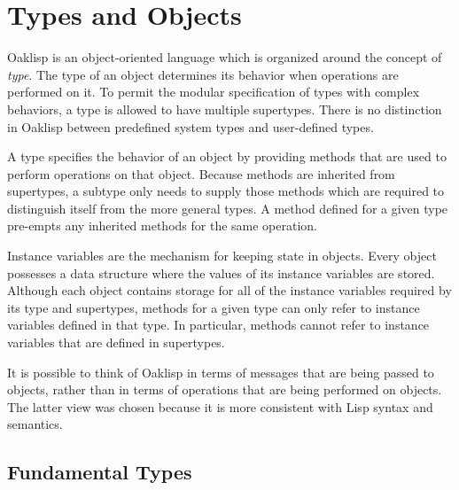 %
%
%


\chapter{Types and Objects} \label{types}


Oaklisp is an object-oriented language which is organized around the
concept of {\it type}.  The type of an object determines its behavior
when operations are performed on it.  To permit the modular
specification of types with complex behaviors, a type is allowed to
have multiple supertypes.  There is no distinction in Oaklisp between
predefined system types and user-defined types.

A type specifies the behavior of an object by providing methods that
are used to perform operations on that object.  Because methods are
inherited from supertypes, a subtype only needs to supply those
methods which are required to distinguish itself from the more general
types.  A method defined for a given type pre-empts any inherited
methods for the same operation.

Instance variables are the mechanism for keeping state in objects.
Every object possesses a data structure where the values of its
instance variables are stored.  Although each object contains storage
for all of the instance variables required by its type and supertypes,
methods for a given type can only refer to instance variables defined
in that type.  In particular, methods cannot refer to instance
variables that are defined in supertypes.

It is possible to think of Oaklisp in terms of messages that are being
passed to objects, rather than in terms of operations that are being
performed on objects.  The latter view was chosen because it is more
consistent with Lisp syntax and semantics.

\section{Fundamental Types}


